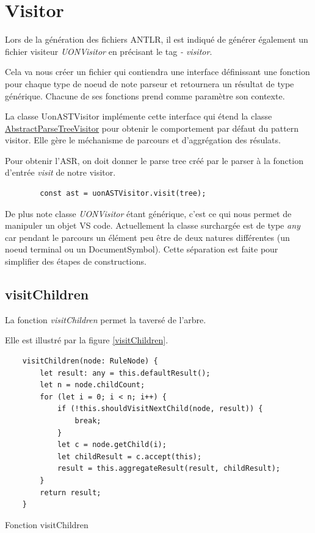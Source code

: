 \documentclass[
    iict, %
    il, %
]{heig-tb}
\begin{document}
\section{Visitor}

Lors de la génération des fichiers ANTLR, il est indiqué de générer également un fichier visiteur \emph{UONVisitor} en précisant le tag \emph{- visitor}.

Cela va nous créer un fichier qui contiendra une interface définissant une fonction pour chaque type de noeud de note parseur et retournera un résultat de type générique.
Chacune de ses fonctions prend comme paramètre son contexte.

La classe UonASTVisitor implémente cette interface qui étend la classe \href{https://www.antlr.org/api/Java/org/antlr/v4/runtime/tree/AbstractParseTreeVisitor.html}{AbstractParseTreeVisitor}
pour obtenir le comportement par défaut du pattern visitor. Elle gère le méchanisme de parcours et d'aggrégation des résulats.

Pour obtenir l'ASR, on doit donner le parse tree créé par le parser à la fonction d'entrée \emph{visit} de notre visitor.

\begin{listing}[!ht]
    \begin{verbatim}
        const ast = uonASTVisitor.visit(tree);
    \end{verbatim}
\end{listing}

De plus note classe \emph{UONVisitor} étant générique, c'est ce qui nous permet de manipuler un objet VS code.
Actuellement la classe surchargée est de type \emph{any} car pendant le parcours un élément peu être de deux natures différentes (un noeud terminal ou un DocumentSymbol).
Cette séparation est faite pour simplifier des étapes de constructions.

\subsection{visitChildren}
La fonction \emph{visitChildren} permet la taversé de l'arbre.

Elle est illustré par la figure \ref{visitChildren}.

\begin{listing}[!ht]
    \begin{verbatim}
    visitChildren(node: RuleNode) {
        let result: any = this.defaultResult();
        let n = node.childCount;
        for (let i = 0; i < n; i++) {
            if (!this.shouldVisitNextChild(node, result)) {
                break;
            }
            let c = node.getChild(i);
            let childResult = c.accept(this);
            result = this.aggregateResult(result, childResult);
        }
        return result;
    }
    \end{verbatim}
    \caption{Fonction visitChildren }
    \label{visitChildren}
\end{listing}
\end{document}
